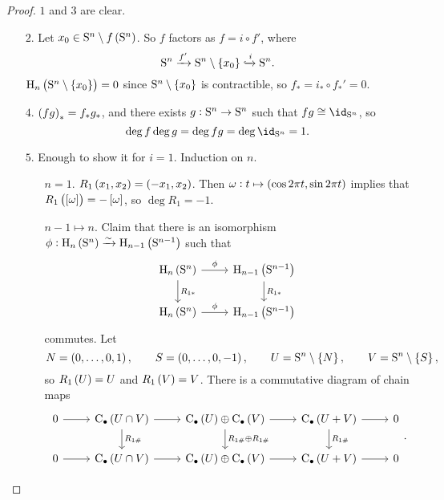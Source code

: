 \begin{proof}
$ 1 $ and $ 3 $ are clear.
\begin{itemize}
\item[$ 2 $.] Let $ x_0 \in \S^n \setminus f\br{\S^n} $. So $ f $ factors as $ f = i \circ f' $, where
$$ \S^n \xrightarrow{f'} \S^n \setminus \cbr{x_0} \xhookrightarrow{i} \S^n. $$
$ \H_n\br{\S^n \setminus \cbr{x_0}} = 0 $ since $ \S^n \setminus \cbr{x_0} $ is contractible, so $ f_* = i_* \circ f_*' = 0 $.
\item[$ 4 $.] $ \br{fg}_* = f_*g_* $, and there exists $ g : \S^n \to \S^n $ such that $ fg \cong \id_{\S^n} $, so
$$ \deg f\deg g = \deg fg = \deg \id_{\S^n} = 1. $$
\item[$ 5 $.] Enough to show it for $ i = 1 $. Induction on $ n $.
\begin{itemize}[leftmargin=2cm]
\item[$ n = 1 $.] $ R_1\br{x_1, x_2} = \br{-x_1, x_2} $. Then $ \omega : t \mapsto \br{\cos 2\pi t, \sin 2\pi t} $ implies that $ R_1\br{\sbr{\omega}} = -\sbr{\omega} $, so $ \deg R_1 = -1 $.
\item[$ n - 1 \mapsto n $.] Claim that there is an isomorphism $ \phi : \H_n\br{\S^n} \xrightarrow{\sim} \H_{n - 1}\br{\S^{n - 1}} $ such that
$$
\begin{tikzcd}
\H_n\br{\S^n} \arrow{r}{\phi} \arrow{d}{R_{1*}} & \H_{n - 1}\br{\S^{n - 1}} \arrow{d}{R_{1*}} \\
\H_n\br{\S^n} \arrow{r}{\phi} & \H_{n - 1}\br{\S^{n - 1}}
\end{tikzcd}
$$
commutes. Let
$$ N = \br{0, \dots, 0, 1}, \qquad S = \br{0, \dots, 0, -1}, \qquad U = \S^n \setminus \cbr{N}, \qquad V = \S^n \setminus \cbr{S}, $$
so $ R_1\br{U} = U $ and $ R_1\br{V} = V $. There is a commutative diagram of chain maps
$$
\begin{tikzcd}
0 \arrow{r} & \C_\bullet\br{U \cap V} \arrow{r} \arrow{d}{R_{1\#}} & \C_\bullet\br{U} \oplus \C_\bullet\br{V} \arrow{r} \arrow{d}{R_{1\#} \oplus R_{1\#}} & \C_\bullet\br{U + V} \arrow{r} \arrow{d}{R_{1\#}} & 0 \\
0 \arrow{r} & \C_\bullet\br{U \cap V} \arrow{r} & \C_\bullet\br{U} \oplus \C_\bullet\br{V} \arrow{r} & \C_\bullet\br{U + V} \arrow{r} & 0
\end{tikzcd}.
$$

\pagebreak


\end{itemize}
\end{itemize}
\end{proof}

